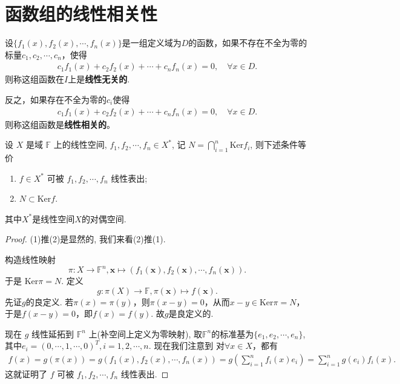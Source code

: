 \documentclass[../../main.tex]{subfiles}%
\begin{document}
\section{函数组的线性相关性}

\begin{definition}[函数组线性无关/相关]
设\(\{f_1(x), f_2(x), \cdots, f_n(x)\}\)是一组定义域为$D$的函数，如果不存在不全为零的标量\(c_1, c_2, \cdots, c_n\)，使得 
\begin{align*}
c_1 f_1(x) + c_2 f_2(x) + \cdots + c_n f_n(x) = 0,\quad \forall x\in D.
\end{align*}
则称这组函数在\(I\)上是\textbf{线性无关的}.

反之，如果存在不全为零的\(c_i\)使得
\begin{align*}
c_1 f_1(x) + c_2 f_2(x) + \cdots + c_n f_n(x) = 0,\quad \forall x\in D.
\end{align*}
则称这组函数是\textbf{线性相关的}。
\end{definition}

\begin{theorem}\label{theorem:高等代数的重要结论1}
设 \( X \) 是域 \( \mathbb{F} \) 上的线性空间, \( f_1, f_2, \cdots, f_n \in X^* \), 记 \( N = \bigcap_{i=1}^n \mathrm{Ker} f_i \), 则下述条件等价
\begin{enumerate}[(1)]
\item \( f \in X^* \) 可被 \( f_1, f_2, \cdots, f_n \) 线性表出;

\item \( N \subset \mathrm{Ker} f \).
\end{enumerate}
其中$X^*$是线性空间$X$的对偶空间.
\end{theorem}
\begin{proof}
(1)推(2)是显然的, 我们来看(2)推(1).

构造线性映射
\[
\pi: X \to \mathbb{F}^n, \mathbf{x} \mapsto (f_1(\mathbf{x}), f_2(\mathbf{x}), \cdots, f_n(\mathbf{x})).
\]
于是 \( \mathrm{Ker} \pi = N \). 定义
\[
g: \pi(X) \to \mathbb{F}, \pi(\mathbf{x}) \mapsto f(\mathbf{x}).
\]
先证$g$的良定义. 若$\pi(x) = \pi(y)$，则$\pi(x - y) = 0$，从而$x - y \in \mathrm{Ker} \pi = N$，于是$f(x - y) = 0$，即$f(x) = f(y)$. 故$g$是良定义的.

现在 \( g \) 线性延拓到 \( \mathbb{F}^n \) 上(补空间上定义为零映射), 取$\mathbb{F}^n$的标准基为$\{e_1,e_2,\cdots,e_n\}$,其中$e_i=(0,\cdots,1,\cdots,0)^T,i=1,2,\cdots,n$.
现在我们注意到
对$\forall x \in X$，都有
\begin{align*}
f(x) = g(\pi(x)) = g(f_1(x), f_2(x), \cdots, f_n(x)) = g\left( \sum_{i=1}^n f_i(x) e_i \right) = \sum_{i=1}^n g(e_i) f_i(x).
\end{align*}
这就证明了 \( f \) 可被 \( f_1, f_2, \cdots, f_n \) 线性表出.
\end{proof}
\end{document}
